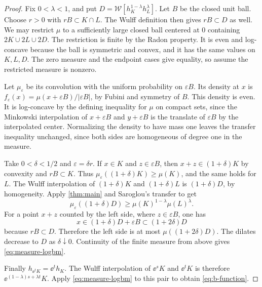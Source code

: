\begin{proof}
Fix $0<\lambda<1$, and put $D=\mathcal W[h_K^{1-\lambda}h_L^\lambda]$. Let $B$ be the closed unit ball. Choose $r>0$ with $rB\subset K\cap L$. The Wulff definition then gives $rB\subset D$ as well. We may restrict $\mu$ to a sufficiently large closed ball centered at $0$ containing $2K\cup2L\cup2D$. The restriction is finite by the Radon property. It is even and log-concave because the ball is symmetric and convex, and it has the same values on $K,L,D$. The zero measure and the endpoint cases give equality, so assume the restricted measure is nonzero.

Let $\mu_\varepsilon$ be its convolution with the uniform probability on $\varepsilon B$. Its density at $x$ is $f_\varepsilon(x)=\mu(x+\varepsilon B)/|\varepsilon B|$, by Fubini and symmetry of $B$. This density is even. It is log-concave by the defining inequality for $\mu$ on compact sets, since the Minkowski interpolation of $x+\varepsilon B$ and $y+\varepsilon B$ is the translate of $\varepsilon B$ by the interpolated center. Normalizing the density to have mass one leaves the transfer inequality unchanged, since both sides are homogeneous of degree one in the measure.

Take $0<\delta<1/2$ and $\varepsilon=\delta r$. If $x\in K$ and $z\in\varepsilon B$, then $x+z\in(1+\delta)K$ by convexity and $rB\subset K$. Thus $\mu_\varepsilon((1+\delta)K)\ge\mu(K)$, and the same holds for $L$. The Wulff interpolation of $(1+\delta)K$ and $(1+\delta)L$ is $(1+\delta)D$, by homogeneity. Apply \cref{thm:main} and Saroglou's transfer to get
\[
 \mu_\varepsilon((1+\delta)D)\ge
 \mu(K)^{1-\lambda}\mu(L)^\lambda.
\]
For a point $x+z$ counted by the left side, where $z\in\varepsilon B$, one has
\[
 x\in (1+\delta)D+\varepsilon B\subset(1+2\delta)D
\]
because $rB\subset D$. Therefore the left side is at most $\mu((1+2\delta)D)$. The dilates decrease to $D$ as $\delta\downarrow0$. Continuity of the finite measure from above gives \eqref{eq:measure-logbm}.

Finally $h_{\ee^t K}=\ee^t h_K$. The Wulff interpolation of $\ee^s K$ and $\ee^t K$ is therefore $\ee^{(1-\lambda)s+\lambda t}K$. Apply \eqref{eq:measure-logbm} to this pair to obtain \eqref{eq:b-function}.
\end{proof}
